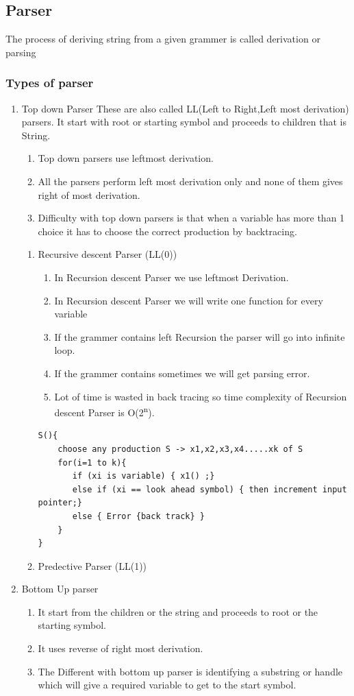 \documentclass[11pt]{article}
\begin{document}
\subsection{Parser}
\label{sec:org37ef6c7}
The process of deriving string from a given grammer is called derivation or parsing
\subsubsection{Types of parser}
\label{sec:org546af25}
\begin{enumerate}
\item Top down Parser
\label{sec:org5002176}
These are also called LL(Left to Right,Left most derivation) parsers.
It start with root or starting symbol and proceeds to children that is String.
\begin{enumerate}
\item Top down parsers use leftmost derivation.
\item All the parsers perform left most derivation only and none of them gives right of most derivation.
\item Difficulty with top down parsers is that when a variable has more than 1 choice it has to choose the correct production by backtracing.
\end{enumerate}
\begin{enumerate}
\item Recursive descent Parser (LL(0))
\label{sec:org00da211}
\begin{enumerate}
\item In Recursion descent Parser we use leftmost Derivation.
\item In Recursion descent Parser we will write one function for every variable
\item If the grammer contains left Recursion the parser will go into infinite loop.
\item If the grammer contains sometimes we will get parsing error.
\item Lot of time is wasted in back tracing so time complexity of Recursion descent Parser is O(2\textsuperscript{n}).
\end{enumerate}
\begin{verbatim}
S(){
    choose any production S -> x1,x2,x3,x4.....xk of S
    for(i=1 to k){
       if (xi is variable) { x1() ;}
       else if (xi == look ahead symbol) { then increment input pointer;}
       else { Error {back track} }
    }
}
\end{verbatim}
\item Predective Parser (LL(1))
\label{sec:orgc2d68a8}
\end{enumerate}
\item Bottom Up parser
\label{sec:org758c573}
\begin{enumerate}
\item It start from the children or the string and proceeds to root or the starting symbol.
\item It uses reverse of right most derivation.
\item The Different with bottom up parser is identifying a substring or handle which will give a required variable to get to the start symbol.
\end{enumerate}
\end{enumerate}
\end{document}
